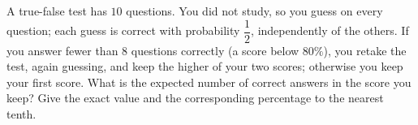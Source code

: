 A true-false test has $10$ questions. You did not study, so you guess on every question; each guess is correct with probability $\dfrac{1}{2}$, independently of the others. If you answer fewer than $8$ questions correctly (a score below $80\%$), you retake the test, again guessing, and keep the higher of your two scores; otherwise you keep your first score. What is the expected number of correct answers in the score you keep? Give the exact value and the corresponding percentage to the nearest tenth.
